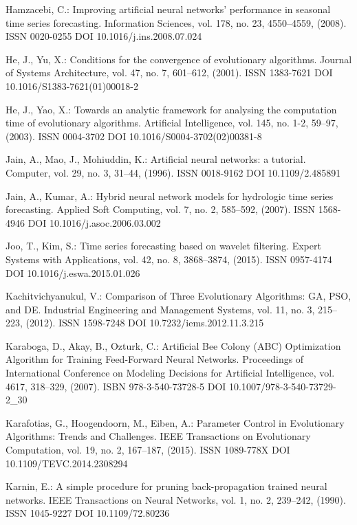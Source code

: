 \begin{thebibliography}{99.}
 Hamzacebi, C.: Improving artificial neural networks’ performance in seasonal time series forecasting. Information Sciences, vol. 178, no. 23, 4550--4559, (2008). ISSN 0020-0255 DOI 10.1016/j.ins.2008.07.024

 He, J., Yu, X.: Conditions for the convergence of evolutionary algorithms. Journal of Systems Architecture, vol. 47, no. 7, 601--612, (2001). ISSN 1383-7621 DOI 10.1016/S1383-7621(01)00018-2

 He, J., Yao, X.: Towards an analytic framework for analysing the computation time of evolutionary algorithms. Artificial Intelligence, vol. 145, no. 1-2, 59--97, (2003). ISSN 0004-3702 DOI 10.1016/S0004-3702(02)00381-8

 Jain, A., Mao, J., Mohiuddin, K.: Artificial neural networks: a tutorial. Computer, vol. 29, no. 3, 31--44, (1996). ISSN 0018-9162 DOI 10.1109/2.485891

 Jain, A., Kumar, A.: Hybrid neural network models for hydrologic time series forecasting. Applied Soft Computing, vol. 7, no. 2, 585--592, (2007). ISSN 1568-4946 DOI 10.1016/j.asoc.2006.03.002

 Joo, T., Kim, S.: Time series forecasting based on wavelet filtering. Expert Systems with Applications, vol. 42, no. 8, 3868--3874, (2015). ISSN 0957-4174 DOI 10.1016/j.eswa.2015.01.026

 Kachitvichyanukul, V.: Comparison of Three Evolutionary Algorithms: GA, PSO, and DE. Industrial Engineering and Management Systems, vol. 11, no. 3, 215--223, (2012). ISSN 1598-7248 DOI 10.7232/iems.2012.11.3.215

 Karaboga, D., Akay, B., Ozturk, C.: Artificial Bee Colony (ABC) Optimization Algorithm for Training Feed-Forward Neural Networks. Proceedings of International Conference on Modeling Decisions for Artificial Intelligence, vol. 4617, 318--329, (2007). ISBN 978-3-540-73728-5 DOI 10.1007/978-3-540-73729-2\_30

 Karafotias, G., Hoogendoorn, M., Eiben, A.: Parameter Control in Evolutionary Algorithms: Trends and Challenges. IEEE Transactions on Evolutionary Computation, vol. 19, no. 2, 167--187, (2015). ISSN 1089-778X DOI 10.1109/TEVC.2014.2308294

 Karnin, E.: A simple procedure for pruning back-propagation trained neural networks. IEEE Transactions on Neural Networks, vol. 1, no. 2, 239--242, (1990). ISSN 1045-9227 DOI 10.1109/72.80236


\end{thebibliography}
